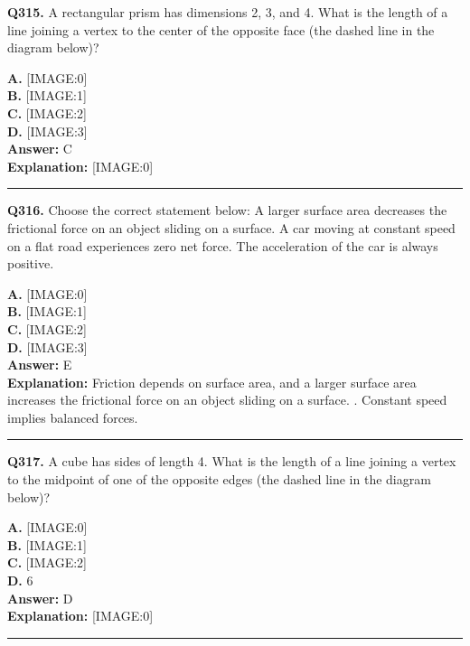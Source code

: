 \documentclass[12pt]{article}
\begin{document}
\noindent
\textbf{Q315.} A rectangular prism has dimensions 2, 3, and 4. What is the length of a line joining a vertex to the center of the opposite face (the dashed line in the diagram below)?



\textbf{A.} [IMAGE:0] \\
\textbf{B.} [IMAGE:1] \\
\textbf{C.} [IMAGE:2] \\
\textbf{D.} [IMAGE:3] \\

\textbf{Answer:} C \\
\textbf{Explanation:} [IMAGE:0]

\hrule
\vspace{1em}


\noindent
\textbf{Q316.} Choose the correct statement below:
A larger surface area decreases the frictional force on an object sliding on a surface.
A car moving at constant speed on a flat road experiences zero net force.
The acceleration of the car is always positive.



\textbf{A.} [IMAGE:0] \\
\textbf{B.} [IMAGE:1] \\
\textbf{C.} [IMAGE:2] \\
\textbf{D.} [IMAGE:3] \\

\textbf{Answer:} E \\
\textbf{Explanation:} Friction depends on surface area, and a larger surface area increases the frictional force on an object sliding on a surface. . Constant speed implies balanced forces.

\hrule
\vspace{1em}


\noindent
\textbf{Q317.} A cube has sides of length 4. What is the length of a line joining a vertex to the midpoint of one of the opposite edges (the dashed line in the diagram below)?



\textbf{A.} [IMAGE:0] \\
\textbf{B.} [IMAGE:1] \\
\textbf{C.} [IMAGE:2] \\
\textbf{D.} 6 \\

\textbf{Answer:} D \\
\textbf{Explanation:} [IMAGE:0]

\hrule
\vspace{1em}
\end{document}
